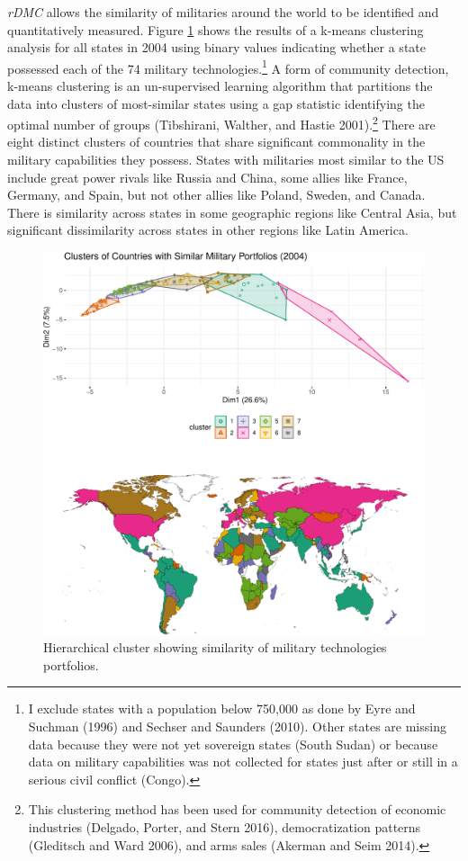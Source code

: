 \documentclass[
]{article}
\begin{document}
\emph{rDMC} allows the similarity of militaries around the world to be identified and quantitatively measured. Figure \ref{fig:country-clusters} shows the results of a k-means clustering analysis for all states in 2004 using binary values indicating whether a state possessed each of the 74 military technologies.\footnote{I exclude states with a population below 750,000 as done by Eyre and Suchman (1996) and Sechser and Saunders (2010). Other states are missing data because they were not yet sovereign states (South Sudan) or because data on military capabilities was not collected for states just after or still in a serious civil conflict (Congo).} A form of community detection, k-means clustering is an un-supervised learning algorithm that partitions the data into clusters of most-similar states using a gap statistic identifying the optimal number of groups (Tibshirani, Walther, and Hastie 2001).\footnote{This clustering method has been used for community detection of economic industries (Delgado, Porter, and Stern 2016), democratization patterns (Gleditsch and Ward 2006), and arms sales (Akerman and Seim 2014).} There are eight distinct clusters of countries that share significant commonality in the military capabilities they possess. States with militaries most similar to the US include great power rivals like Russia and China, some allies like France, Germany, and Spain, but not other allies like Poland, Sweden, and Canada. There is similarity across states in some geographic regions like Central Asia, but significant dissimilarity across states in other regions like Latin America.

\begin{figure}
\centering
\includegraphics{figures/country-clusters-1.pdf}
\caption{\label{fig:country-clusters}Hierarchical cluster showing similarity of military technologies portfolios.}
\end{figure}
\end{document}
